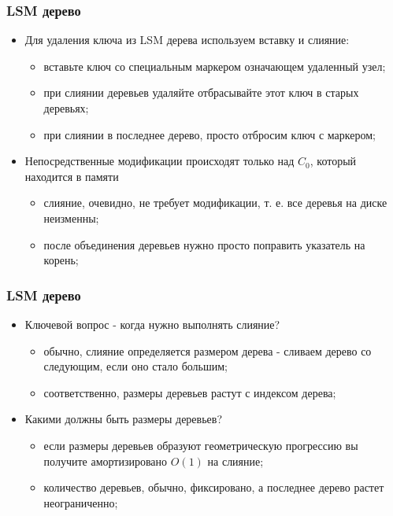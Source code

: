 \begin{frame}
\frametitle{LSM дерево}
\begin{itemize}
  \item<1-> Для удаления ключа из LSM дерева используем вставку и слияние:
    \begin{itemize}
      \item вставьте ключ со специальным маркером означающем удаленный узел;
      \item при слиянии деревьев удаляйте отбрасывайте этот ключ в старых деревьях;
      \item при слиянии в последнее дерево, просто отбросим ключ с маркером;
    \end{itemize}
  \item<2-> Непосредственные модификации происходят только над $C_0$, который находится в памяти
    \begin{itemize}
      \item слияние, очевидно, не требует модификации, т. е. все деревья на диске неизменны;
      \item после объединения деревьев нужно просто поправить указатель на корень;
    \end{itemize}
\end{itemize}
\end{frame}

\begin{frame}
\frametitle{LSM дерево}
\begin{itemize}
  \item<1-> Ключевой вопрос - когда нужно выполнять слияние?
    \begin{itemize}
      \item обычно, слияние определяется размером дерева - сливаем дерево со следующим, если оно стало большим;
      \item соответственно, размеры деревьев растут с индексом дерева;
    \end{itemize}
  \item<2-> Какими должны быть размеры деревьев?
    \begin{itemize}
      \item если размеры деревьев образуют геометрическую прогрессию вы получите амортизировано $O(1)$ на слияние;
      \item количество деревьев, обычно, фиксировано, а последнее дерево растет неограниченно;
    \end{itemize}
\end{itemize}
\end{frame}
